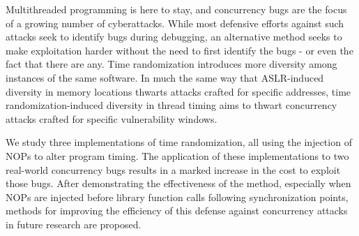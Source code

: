 Multithreaded programming is here to stay, and concurrency bugs are the focus of a growing number of cyberattacks.
While most defensive efforts against such attacks seek to identify bugs during debugging, an alternative method seeks to make exploitation harder without the need to first identify the bugs - or even the fact that there are any.
Time randomization introduces more diversity among instances of the same software.
In much the same way that ASLR-induced diversity in memory locations thwarts attacks crafted for specific addresses, time randomization-induced diversity in thread timing aims to thwart concurrency attacks crafted for specific vulnerability windows.

We study three implementations of time randomization, all using the injection of NOPs to alter program timing.
The application of these implementations to two real-world concurrency bugs results in a marked increase in the cost to exploit those bugs.
After demonstrating the effectiveness of the method, especially when NOPs are injected before library function calls following synchronization points, methods for improving the efficiency of this defense against concurrency attacks in future research are proposed.